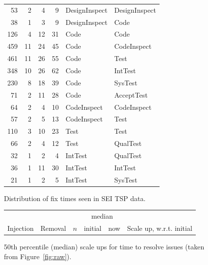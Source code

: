 \documentclass{sig-alternate}
\newcommand{\fig}[1]{Figure~\ref{fig:#1}}
\def\baselinestretch{1}
\begin{document}
\begin{figure}[!t]
\begin{center}
\begin{tabular}{r|rrr|ll}
53& 2& 4& 9&  DesignInspect&DesignInspect\\
38& 1& 3& 9&  DesignInspect&Code\\\hline

126& 4& 12& 31&  Code&Code\\
459& 11& 24& 45&  Code&CodeInspect\\
461& 11& 26& 55&  Code&Test\\
348& 10& 26& 62&  Code&IntTest\\
230& 8& 18& 39&  Code&SysTest\\
71& 2& 11& 28&  Code&AcceptTest\\\hline

64& 2& 4& 10&  CodeInspect&CodeInspect\\
57& 2& 5& 13&  CodeInspect&Test\\\hline



110& 3& 10& 23&  Test&Test\\
66& 2& 4& 12&  Test&QualTest\\\hline


32& 1& 2& 4&  IntTest&QualTest\\
36& 1& 11& 30&  IntTest&IntTest\\
21& 1& 2& 5&  IntTest&SysTest\\
 \end{tabular}
\end{center}
\caption{Distribution of fix times seen in SEI TSP data.}
\label{fig:faw}
\end{figure}
 

\begin{figure}[!t]
\renewcommand{\baselinestretch}{0.7}
\scriptsize
\begin{center}
\begin{tabular}{l@{~~}|l@{~}|r@{~}|r@{~}r@{~}|r@{~}l}
           \multicolumn{2}{c}{~}                 &  &\multicolumn{2}{c|}{median}\\
  Injection&   Removal& $n$ & initial & now & \multicolumn{2}{l}{Scale up, w.r.t. initial}

\end{tabular}
\end{center}
\caption{50th percentile (median) scale ups  for  time to resolve issues (taken from \fig{raw}).}
\label{fig:scale}
\end{figure}
\end{document}
